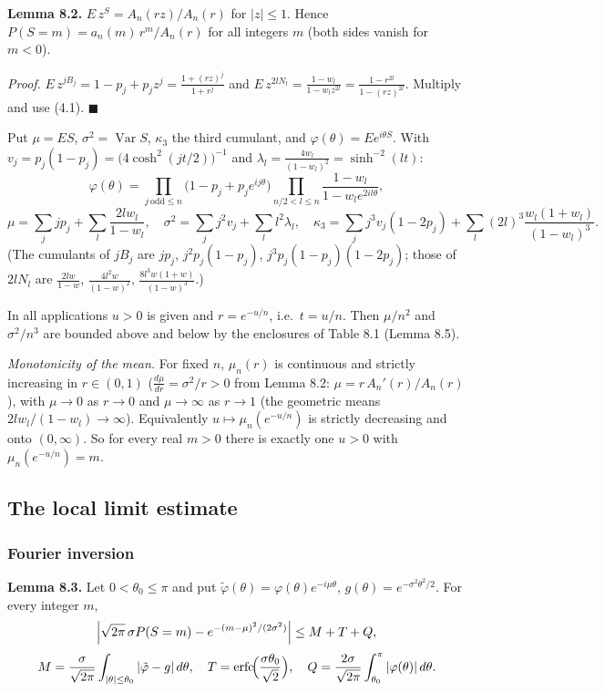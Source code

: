 \textbf{Lemma 8.2.} \(E\,z^{S}=A_n(rz)/A_n(r)\) for \(|z|\le1\). Hence \(P(S=m)=a_n(m)\,r^m/A_n(r)\) for all integers \(m\) (both sides vanish for \(m<0\)).

\emph{Proof.} \(E\,z^{jB_j}=1-p_j+p_jz^j=\frac{1+(rz)^j}{1+r^j}\) and \(E\,z^{2lN_l}=\frac{1-w_l}{1-w_lz^{2l}}=\frac{1-r^{2l}}{1-(rz)^{2l}}\). Multiply and use (4.1). \(\blacksquare\)

Put \(\mu=ES\), \(\sigma^2=\operatorname{Var}S\), \(\kappa_3\) the third cumulant, and \(\varphi(\theta)=Ee^{i\theta S}\). With \(v_j=p_j(1-p_j)=\bigl(4\cosh^2(jt/2)\bigr)^{-1}\) and \(\lambda_l=\frac{4w_l}{(1-w_l)^2}=\sinh^{-2}(lt)\):
\[\varphi(\theta)=\prod_{j\ \mathrm{odd}\le n}\bigl(1-p_j+p_je^{ij\theta}\bigr)\prod_{n/2<l\le n}\frac{1-w_l}{1-w_le^{2il\theta}},\tag{8.1}\]
\[\mu=\sum_jjp_j+\sum_l\frac{2lw_l}{1-w_l},\quad\sigma^2=\sum_jj^2v_j+\sum_ll^2\lambda_l,\quad\kappa_3=\sum_jj^3v_j(1-2p_j)+\sum_l(2l)^3\frac{w_l(1+w_l)}{(1-w_l)^3}.\tag{8.2}\]
(The cumulants of \(jB_j\) are \(jp_j\), \(j^2p_j(1-p_j)\), \(j^3p_j(1-p_j)(1-2p_j)\); those of \(2lN_l\) are \(\frac{2lw}{1-w}\), \(\frac{4l^2w}{(1-w)^2}\), \(\frac{8l^3w(1+w)}{(1-w)^3}\).)

In all applications \(u>0\) is given and \(r=e^{-u/n}\), i.e.~\(t=u/n\). Then \(\mu/n^2\) and \(\sigma^2/n^3\) are bounded above and below by the enclosures of Table 8.1 (Lemma 8.5).

\emph{Monotonicity of the mean.} For fixed \(n\), \(\mu_n(r)\) is continuous and strictly increasing in \(r\in(0,1)\) (\(\frac{d\mu}{dr}=\sigma^2/r>0\) from Lemma 8.2: \(\mu=r\,A_n'(r)/A_n(r)\)), with \(\mu\to0\) as \(r\to0\) and \(\mu\to\infty\) as \(r\to1\) (the geometric means \(2lw_l/(1-w_l)\to\infty\)). Equivalently \(u\mapsto\mu_n(e^{-u/n})\) is strictly decreasing and onto \((0,\infty)\). So for every real \(m>0\) there is exactly one \(u>0\) with \(\mu_n(e^{-u/n})=m\).

\subsection{The local limit estimate}\label{the-local-limit-estimate}

\subsubsection{Fourier inversion}\label{fourier-inversion}

\textbf{Lemma 8.3.} Let \(0<\theta_0\le\pi\) and put \(\tilde\varphi(\theta)=\varphi(\theta)e^{-i\mu\theta}\), \(g(\theta)=e^{-\sigma^2\theta^2/2}\). For every integer \(m\),
\[\Bigl|\sqrt{2\pi}\,\sigma P(S=m)-e^{-(m-\mu)^2/(2\sigma^2)}\Bigr|\le M+T+Q,\]
\[M=\frac{\sigma}{\sqrt{2\pi}}\int_{|\theta|\le\theta_0}|\tilde\varphi-g|\,d\theta,\quad T=\operatorname{erfc}\!\Bigl(\frac{\sigma\theta_0}{\sqrt2}\Bigr),\quad Q=\frac{2\sigma}{\sqrt{2\pi}}\int_{\theta_0}^{\pi}|\varphi(\theta)|\,d\theta .\]


